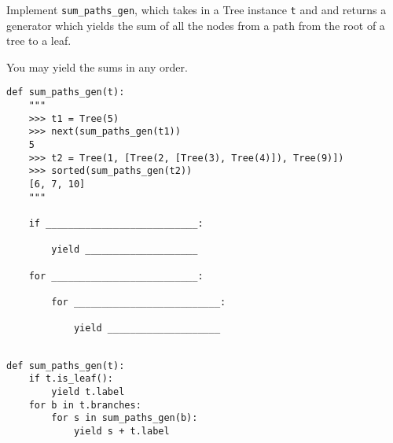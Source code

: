 \question Implement \texttt{sum\_paths\_gen}, which takes in a Tree instance \texttt{t} and
and returns a generator which yields the sum of all the nodes from a path from the root 
of a tree to a leaf.

You may yield the sums in any order.

\begin{lstlisting}
def sum_paths_gen(t):
    """
    >>> t1 = Tree(5)
    >>> next(sum_paths_gen(t1))
    5
    >>> t2 = Tree(1, [Tree(2, [Tree(3), Tree(4)]), Tree(9)])
    >>> sorted(sum_paths_gen(t2))
    [6, 7, 10]
    """

    if ___________________________:

        yield ____________________

    for __________________________:
        
        for __________________________:

            yield ____________________  
            
\end{lstlisting}

\begin{solution}[1.5in]
\begin{lstlisting}
def sum_paths_gen(t):
    if t.is_leaf():
        yield t.label
    for b in t.branches:
        for s in sum_paths_gen(b):
            yield s + t.label
\end{lstlisting}
\end{solution}